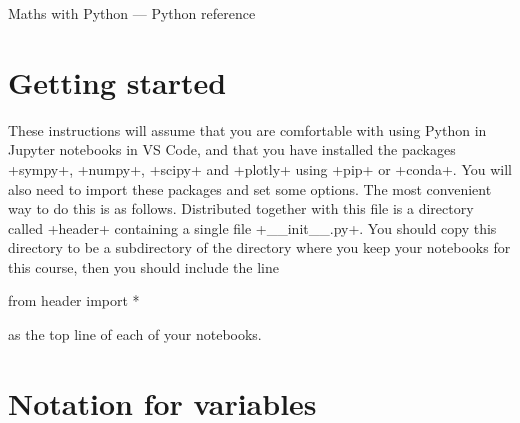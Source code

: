 \documentclass[a4paper,10pt]{amsbook}
\begin{document}
\begin{center}
 {\Large Maths with Python --- Python reference}
\end{center}
\vspace{4ex}

\section{Getting started}
\label{sec-start}

These instructions will assume that you are comfortable with using
Python in Jupyter notebooks in VS Code, and that you have installed 
the packages \pcode+sympy+, \pcode+numpy+, \pcode+scipy+ and
\pcode+plotly+ using \pcode+pip+ or \pcode+conda+.  You will also 
need to import these packages and set some options.  The most
convenient way to do this is as follows.  Distributed together with
this file is a directory called \pcode+header+ containing a single
file \pcode+__init__.py+.  You should copy this directory to be a
subdirectory of the directory where you keep your notebooks for this
course, then you should include the line 
\begin{pcodeblock}
 from header import *
\end{pcodeblock}
as the top line of each of your notebooks.

\section{Notation for variables}
\end{document}
